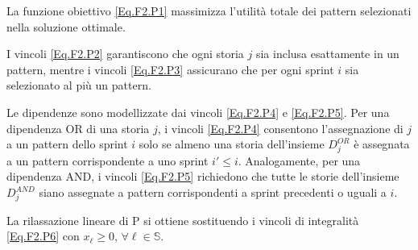 \documentclass[12pt,a4paper,openright,twoside]{book}
\begin{document}
La funzione obiettivo \eqref{Eq.F2.P1} massimizza l'utilità totale dei pattern selezionati nella soluzione ottimale.

I vincoli \eqref{Eq.F2.P2} garantiscono che ogni storia $j$ sia inclusa esattamente in un pattern, mentre i vincoli \eqref{Eq.F2.P3} assicurano che per ogni sprint $i$ sia selezionato al più un pattern.

Le dipendenze sono modellizzate dai vincoli \eqref{Eq.F2.P4} e \eqref{Eq.F2.P5}. Per una dipendenza OR di una storia $j$, i vincoli \eqref{Eq.F2.P4} consentono l'assegnazione di $j$ a un pattern dello sprint $i$ solo se almeno una storia dell'insieme $D_j^{OR}$ è assegnata a un pattern corrispondente a uno sprint $i' \leq i$. Analogamente, per una dipendenza AND, i vincoli \eqref{Eq.F2.P5} richiedono che tutte le storie dell'insieme $D_j^{AND}$ siano assegnate a pattern corrispondenti a sprint precedenti o uguali a $i$.

La rilassazione lineare di P si ottiene sostituendo i vincoli di integralità \eqref{Eq.F2.P6} con $x_{\ell} \geq 0$, $\forall \ell \in \mathbb{S}$.
\end{document}
